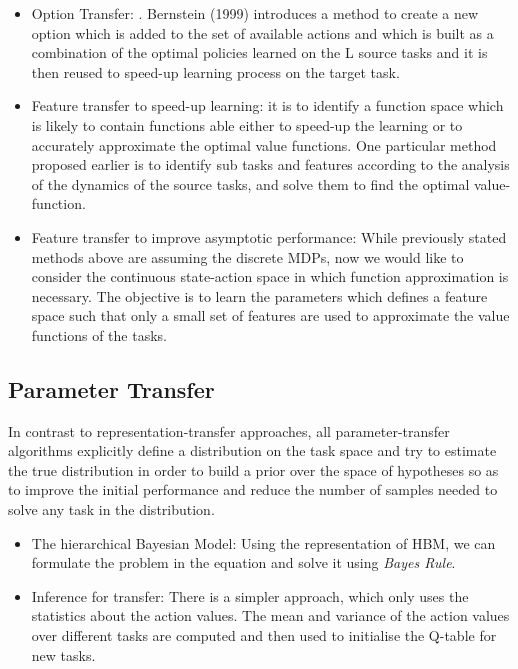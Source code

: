 \documentclass{article}
\begin{document}
\begin{itemize}
    \item Option Transfer: . Bernstein (1999) introduces a method to create a new option which is added to the set of available actions and which is built as a combination of the optimal policies learned on the L source tasks and it is then reused to speed-up learning process on the target task.
    \item Feature transfer to speed-up learning: it is to identify a function space which is likely to contain functions able either to speed-up the learning or to accurately approximate the optimal value functions. One particular method proposed earlier is to identify sub tasks and features according to the analysis of the dynamics of the source tasks, and solve them to find the optimal value-function.
    \item Feature transfer to improve asymptotic performance: While previously stated methods above are assuming the discrete MDPs, now we would like to consider the continuous state-action space in which function approximation is necessary. The objective is to learn the parameters which defines a feature space such that only a small set of features are used to approximate the value functions of the tasks.
\end{itemize}

\subsection{Parameter Transfer}
In contrast to representation-transfer approaches, all parameter-transfer algorithms explicitly define a distribution on the task space and try to estimate the true distribution in order to build a prior over the space of hypotheses so as to improve the initial performance and reduce the number of samples needed to solve any task in the distribution.

\begin{itemize}
    \item The hierarchical Bayesian Model: Using the representation of HBM, we can formulate the problem in the equation and solve it using \textit{Bayes Rule}.
    \item Inference for transfer: There is a simpler approach, which only uses the statistics about the action values. The mean and variance of the action values over different tasks are computed and then used to initialise the Q-table for new tasks.
\end{itemize}
\end{document}
